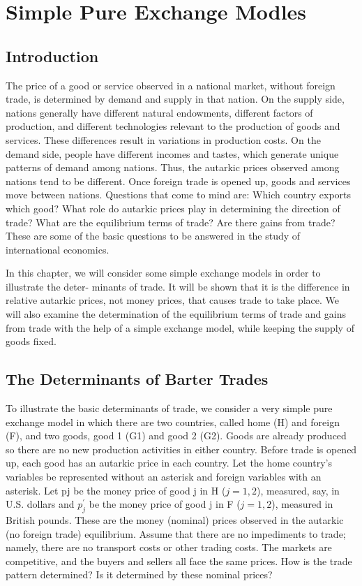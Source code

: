 \section{Simple Pure Exchange Modles}

\subsection{Introduction}

The price of a good or service observed in a national market, without foreign trade, is determined by demand and supply in that nation. On the supply side, nations generally have different natural endowments, different factors of production, and different technologies relevant to the production of goods and services. These differences result in variations in production costs. On the demand side, people have different incomes and tastes, which generate unique patterns of demand among nations. Thus, the autarkic prices observed among nations tend to be different. Once foreign trade is opened up, goods and services move between nations. Questions that come to mind are: Which country exports which good? What role do autarkic prices play in determining the direction of trade? What are the equilibrium terms of trade? Are there gains from trade? These are some of the basic questions to be answered in the study of international economics.

In this chapter, we will consider some simple exchange models in order to illustrate the deter- minants of trade. It will be shown that it is the difference in relative autarkic prices, not money prices, that causes trade to take place. We will also examine the determination of the equilibrium terms of trade and gains from trade with the help of a simple exchange model, while keeping the supply of goods fixed.

\subsection{The Determinants of Barter Trades}

To illustrate the basic determinants of trade, we consider a very simple pure exchange model in which there are two countries, called home (H) and foreign (F), and two goods, good 1 (G1) and good 2 (G2). Goods are already produced so there are no new production activities in either country. Before trade is opened up, each good has an autarkic price in each country. Let the home country's variables be represented without an asterisk and foreign variables with an asterisk. Let pj be the money price of good j in H ($j = 1, 2$), measured, say, in U.S. dollars and $p_j^{\prime}$ be the money price of good j in F ($j = 1, 2$), measured in British pounds. These are the money (nominal) prices observed in the autarkic (no foreign trade) equilibrium. Assume that there are no impediments to trade; namely, there are no transport costs or other trading costs. The markets are competitive, and the buyers and sellers all face the same prices. How is the trade pattern determined? Is it determined by these nominal prices?


